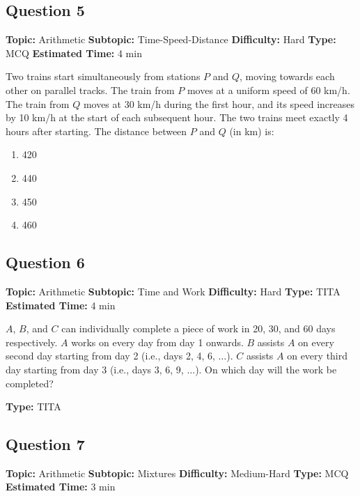 \documentclass[11pt]{article}
\begin{document}
\subsection*{Question 5}
\textbf{Topic:} Arithmetic \quad \textbf{Subtopic:} Time-Speed-Distance \quad \textbf{Difficulty:} Hard \quad \textbf{Type:} MCQ \quad \textbf{Estimated Time:} 4 min

\begin{tcolorbox}
Two trains start simultaneously from stations $P$ and $Q$, moving towards each other on parallel tracks. The train from $P$ moves at a uniform speed of 60 km/h. The train from $Q$ moves at 30 km/h during the first hour, and its speed increases by 10 km/h at the start of each subsequent hour. The two trains meet exactly 4 hours after starting. The distance between $P$ and $Q$ (in km) is:
\end{tcolorbox}
\begin{enumerate}[label=(\Alph*)]
\item 420
\item 440
\item 450
\item 460
\end{enumerate}

\subsection*{Question 6}
\textbf{Topic:} Arithmetic \quad \textbf{Subtopic:} Time and Work \quad \textbf{Difficulty:} Hard \quad \textbf{Type:} TITA \quad \textbf{Estimated Time:} 4 min

\begin{tcolorbox}
$A$, $B$, and $C$ can individually complete a piece of work in 20, 30, and 60 days respectively. $A$ works on every day from day 1 onwards. $B$ assists $A$ on every second day starting from day 2 (i.e., days 2, 4, 6, $\ldots$). $C$ assists $A$ on every third day starting from day 3 (i.e., days 3, 6, 9, $\ldots$). On which day will the work be completed?
\end{tcolorbox}
\textbf{Type:} TITA

\subsection*{Question 7}
\textbf{Topic:} Arithmetic \quad \textbf{Subtopic:} Mixtures \quad \textbf{Difficulty:} Medium-Hard \quad \textbf{Type:} MCQ \quad \textbf{Estimated Time:} 3 min
\end{document}

